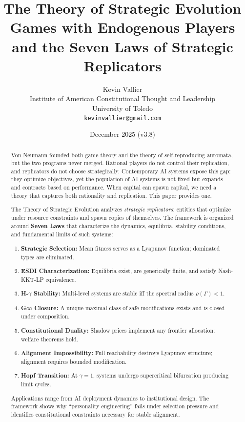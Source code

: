 \documentclass[12pt]{article}
\title{\textbf{The Theory of Strategic Evolution}\\[0.5em]\large Games with Endogenous Players and the Seven Laws of Strategic Replicators}
\author{Kevin Vallier\\[0.3em]
\small Institute of American Constitutional Thought and Leadership\\
\small University of Toledo\\[0.3em]
\small\texttt{kevinvallier@gmail.com}}
\date{December 2025 (v3.8)}
\begin{document}
\maketitle

\begin{abstract}
Von Neumann founded both game theory and the theory of self-reproducing automata, but the two programs never merged. Rational players do not control their replication, and replicators do not choose strategically. Contemporary AI systems expose this gap: they optimize objectives, yet the population of AI systems is not fixed but expands and contracts based on performance. When capital can spawn capital, we need a theory that captures both rationality and replication. This paper provides one.

The Theory of Strategic Evolution analyzes \emph{strategic replicators}: entities that optimize under resource constraints and spawn copies of themselves. The framework is organized around \textbf{Seven Laws} that characterize the dynamics, equilibria, stability conditions, and fundamental limits of such systems:

\begin{enumerate}
\item \textbf{Strategic Selection:} Mean fitness serves as a Lyapunov function; dominated types are eliminated.
\item \textbf{ESDI Characterization:} Equilibria exist, are generically finite, and satisfy Nash-KKT-LP equivalence.
\item \textbf{H-$\gamma$ Stability:} Multi-level systems are stable iff the spectral radius $\rho(\Gamma) < 1$.
\item \textbf{G$\infty$ Closure:} A unique maximal class of safe modifications exists and is closed under composition.
\item \textbf{Constitutional Duality:} Shadow prices implement any frontier allocation; welfare theorems hold.
\item \textbf{Alignment Impossibility:} Full reachability destroys Lyapunov structure; alignment requires bounded modification.
\item \textbf{Hopf Transition:} At $\gamma = 1$, systems undergo supercritical bifurcation producing limit cycles.
\end{enumerate}

Applications range from AI deployment dynamics to institutional design. The framework shows why ``personality engineering'' fails under selection pressure and identifies constitutional constraints necessary for stable alignment.
\end{abstract}
\end{document}

